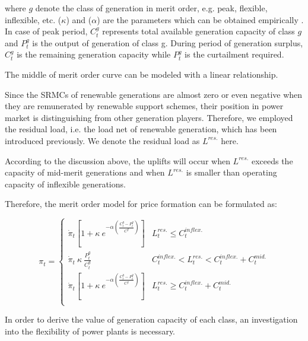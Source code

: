 where $g$ denote the class of generation in merit order, e.g. peak, flexible, inflexible, etc. ($\kappa$) and ($\alpha$) are the parameters which can be obtained empirically \cite{Cox2009}. In case of peak period, $C^g_t$ represents total available generation capacity of class $g$ and $P^g_t$ is the output of generation of class g. During period of generation surplus, $C^g_t$ is the remaining generation capacity while $P^g_t$ is the curtailment required.

The middle of merit order curve can be modeled with a linear relationship.

Since the SRMCs of renewable generations are almost zero or even negative when they are remunerated by renewable support schemes, their position in power market is distinguishing from other generation players. Therefore, we employed the residual load, i.e. the load net of renewable generation, which has been introduced previously. We denote the residual load as $L^{res.}$ here.

According to the discussion above, the uplifts will occur when $L^{res.}$ exceeds the capacity of mid-merit generations and when $L^{res.}$ is smaller than operating capacity of inflexible generations.

Therefore, the merit order model for price formation can be formulated as:

\begin{equation}
\label{eq:merit-order-model}
\pi_t = \begin{cases}
\dot{\pi}_t \left[1 + \kappa~e^{-\alpha\left(\frac{C_t^g -P^g_t }{C^g}\right)} \right] & L^{res.}_t \leq C^{inflex.}_t\\ 
\dot{\pi}_t ~\kappa~\frac{P^g_t}{C_t^g} & C^{inflex.}_t < L^{res.}_t < C^{inflex.}_t+ C^{mid.}_t\\
\dot{\pi}_t  \left[1 + \kappa~e^{-\alpha\left(\frac{C_t^g -P^g_t }{C^g}\right)} \right] & L^{res.}_t \geq C^{inflex.}_t + C^{mid.}_t\\
\end{cases}
\end{equation}

In order to derive the value of generation capacity of each class, an investigation into the flexibility of power plants is necessary.

